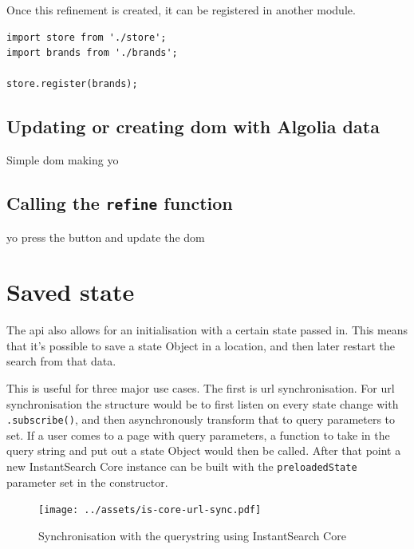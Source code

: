 Once this refinement is created, it can be registered in another module. %

\begin{minipage}{\linewidth}
\begin{lstlisting}[caption={Registering a refinement},label={lst:registering-refinement}]
import store from './store';
import brands from './brands';

store.register(brands);
\end{lstlisting}
\end{minipage}

\subsection{Updating or creating \acrshort{dom} with Algolia data}
\label{subs:data_to_dom}

Simple dom making yo %

\subsection{Calling the {\tt refine} function}
\label{subs:refining}

yo press the button and update the dom %


\section{Saved state} %
\label{sec:saved_state}

The \acrshort{api} also allows for an initialisation with a certain state passed in. This means that it's possible to save a state Object in a location, and then later restart the search from that data. 

This is useful for three major use cases. The first is \acrshort{url} synchronisation. For \acrshort{url} synchronisation the structure would be to first listen on every state change with {\tt .subscribe()}, and then asynchronously transform that to query parameters to set. If a user comes to a page with query parameters, a function to take in the query string and put out a state Object would then be called. After that point a new InstantSearch Core instance can be built with the {\tt preloadedState} parameter set in the constructor.

\begin{figure}[H]
  \centering
  \texttt{[image: ../assets/is-core-url-sync.pdf]}
  \caption{Synchronisation with the querystring using InstantSearch Core}
  \label{figure:is-core-url-sync}
\end{figure} %

